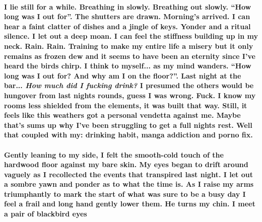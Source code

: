 \documentclass{book}
\begin{document}

\paragraph{I lie still for a while. Breathing in slowly. Breathing out slowly. ``How long was I out for''. The shutters are drawn. Morning's arrived. I can hear a faint clatter of dishes and a jingle of keys. Yonder and a ritual silence. I let out a deep moan. I can feel the stiffness building up in my neck. Rain. Rain. Training to make my entire life a misery but it only remains as frozen dew and it seems to have been an eternity since I've heard the birds chirp. I think to myself... as my mind wanders. ``How long was I out for? And why am I on the floor?''. Last night at the bar... \textit{How much did I fucking drink?} I presumed the others would be hungover from last nights rounds, guess I was wrong. Fuck. I know my rooms less shielded from the elements, it was built that way. Still, it feels like this weathers got a personal vendetta against me. Maybe that's sums up why I've been struggling to get a full nights rest. Well that coupled with my: drinking habit, manga addiction and porno fix.}



\paragraph{Gently leaning to my side, I felt the smooth-cold touch of the hardwood floor against my bare skin. My eyes began to drift around vaguely as I recollected the events that transpired last night. I let out a sombre yawn and ponder as to what the time is. As I raise my arms triumphantly to mark the start of what was sure to be a busy day I feel a frail and long hand gently lower them. He turns my chin. I meet a pair of blackbird eyes}
\end{document}
